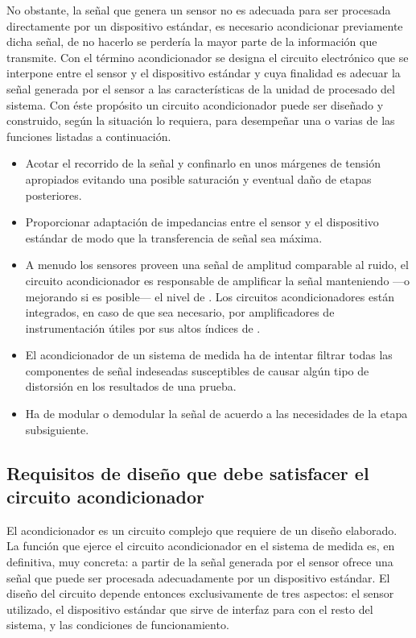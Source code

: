 No obstante, la señal que genera un sensor no es adecuada para ser
procesada directamente por un dispositivo estándar, es necesario
acondicionar previamente dicha señal, de no hacerlo se perdería la mayor
parte de la información que transmite. Con el término acondicionador se
designa el circuito electrónico que se interpone entre el sensor y el
dispositivo estándar y cuya finalidad es adecuar la señal generada por el
sensor a las características de la unidad de procesado del sistema. Con
éste propósito un circuito acondicionador puede ser diseñado y construido,
según la situación lo requiera, para desempeñar una o varias de las
funciones listadas a continuación.

\begin{itemize}
	\item Acotar el recorrido de la señal y confinarlo en unos márgenes
	    de tensión apropiados evitando una posible saturación y
	    eventual daño de etapas posteriores.
	\item Proporcionar adaptación de impedancias entre el sensor y el
	    dispositivo estándar de modo que la transferencia de señal sea
	    máxima.
	\item A menudo los sensores proveen una señal de amplitud
	    comparable al ruido, el circuito acondicionador es responsable
	    de amplificar la señal manteniendo ---o mejorando si es
	    posible--- el nivel de . Los circuitos
	    acondicionadores están integrados, en caso de que sea
	    necesario, por amplificadores de instrumentación útiles por sus
	    altos índices de .
	\item El acondicionador de un sistema de medida ha de intentar
	    filtrar todas las componentes de señal indeseadas susceptibles
	    de causar algún tipo de distorsión en los resultados de una
	    prueba.
	\item Ha de modular o demodular la señal de acuerdo a las
	    necesidades de la etapa subsiguiente.
\end{itemize}


\subsection[Requisitos de diseño del circuito acondicionador]{Requisitos de
diseño que debe satisfacer el circuito acondicionador}

El acondicionador es un circuito complejo que requiere de un diseño
elaborado. La función que ejerce el circuito acondicionador en el sistema
de medida es, en definitiva, muy concreta: a partir de la señal generada
por el sensor ofrece una señal que puede ser procesada adecuadamente por un
dispositivo estándar. El diseño del circuito depende entonces
exclusivamente de tres aspectos: el sensor utilizado, el dispositivo
estándar que sirve de interfaz para con el resto del sistema, y las
condiciones de funcionamiento.

